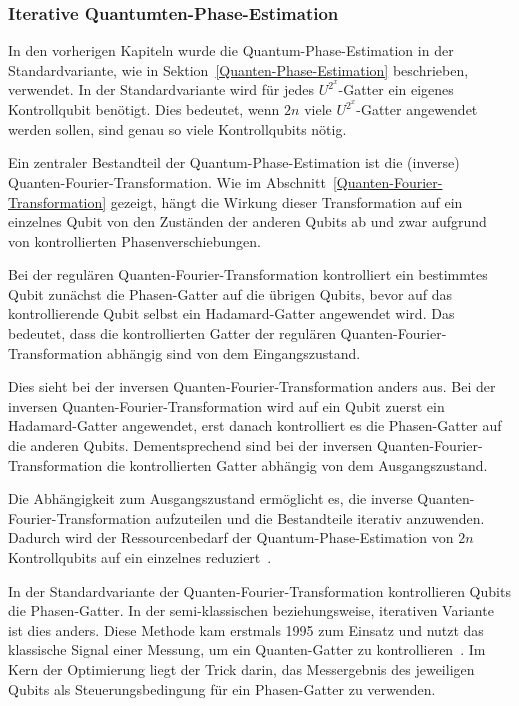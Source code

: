 \subsubsection{Iterative Quantumten-Phase-Estimation}
In den vorherigen Kapiteln wurde die Quantum-Phase-Estimation in der Standardvariante, 
wie in Sektion~\ref{Quanten-Phase-Estimation} beschrieben, verwendet.
In der Standardvariante wird für jedes \(U^{2^x}\)-Gatter ein eigenes Kontrollqubit benötigt.
Dies bedeutet, wenn \(2n\) viele \(U^{2^x}\)-Gatter angewendet werden sollen, 
sind genau so viele Kontrollqubits nötig.

Ein zentraler Bestandteil der Quantum-Phase-Estimation ist die (inverse) Quanten-Fourier-Transformation. 
Wie im Abschnitt~\ref{Quanten-Fourier-Transformation} gezeigt, 
hängt die Wirkung dieser Transformation auf ein einzelnes Qubit von den Zuständen der anderen Qubits ab 
und zwar aufgrund von kontrollierten Phasenverschiebungen.

Bei der regulären Quanten-Fourier-Transformation kontrolliert ein bestimmtes Qubit zunächst die Phasen-Gatter auf die übrigen Qubits, 
bevor auf das kontrollierende Qubit selbst ein Hadamard-Gatter angewendet wird.
Das bedeutet, dass die kontrollierten Gatter der regulären Quanten-Fourier-Transformation abhängig sind von dem Eingangszustand.

Dies sieht bei der inversen Quanten-Fourier-Transformation anders aus.
Bei der inversen Quanten-Fourier-Transformation wird auf ein Qubit zuerst ein Hadamard-Gatter angewendet, 
erst danach kontrolliert es die Phasen-Gatter auf die anderen Qubits.
Dementsprechend sind bei der inversen Quanten-Fourier-Transformation die kontrollierten Gatter abhängig von dem Ausgangszustand.

Die Abhängigkeit zum Ausgangszustand ermöglicht es, 
die inverse Quanten-Fourier-Transformation aufzuteilen und die Bestandteile iterativ anzuwenden.
Dadurch wird der Ressourcenbedarf der Quantum-Phase-Estimation von \(2n\) Kontrollqubits auf ein einzelnes reduziert~\cite{Parker2000}.

In der Standardvariante der Quanten-Fourier-Transformation kontrollieren Qubits die Phasen-Gatter.
In der semi-klassischen beziehungsweise, iterativen Variante ist dies anders.
Diese Methode kam erstmals 1995 zum Einsatz und 
nutzt das klassische Signal einer Messung, 
um ein Quanten-Gatter zu kontrollieren~\cite{Griffiths_1996}.
Im Kern der Optimierung liegt der Trick darin, 
das Messergebnis des jeweiligen Qubits als Steuerungsbedingung für ein Phasen-Gatter zu verwenden.

